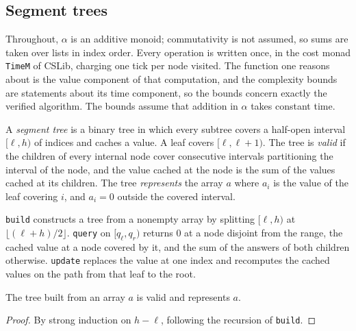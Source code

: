 %
\subsection{Segment trees}

Throughout, $\alpha$ is an additive monoid; commutativity is not assumed, so sums are taken
over lists in index order. Every operation is written once, in the cost monad
\texttt{TimeM} of CSLib, charging one tick per node visited. The function one reasons
about is the value component of that computation, and the complexity bounds are statements
about its time component, so the bounds concern exactly the verified algorithm. The bounds
assume that addition in $\alpha$ takes constant time.

\begin{definition}
  \label{def:segment-tree}
  \leanok
  A \emph{segment tree} is a binary tree in which every subtree covers a half-open
  interval $[\ell, h)$ of indices and caches a value. A leaf covers $[\ell, \ell + 1)$. The
  tree is \emph{valid} if the children of every internal node cover consecutive intervals
  partitioning the interval of the node, and the value cached at the node is the sum of the
  values cached at its children. The tree \emph{represents} the array $a$ where $a_i$ is the
  value of the leaf covering $i$, and $a_i = 0$ outside the covered interval.
\end{definition}

\begin{definition}
  \label{def:segment-tree-ops}
  \leanok
  \texttt{build} constructs a tree from a nonempty array by splitting $[\ell, h)$ at
  $\lfloor (\ell + h) / 2 \rfloor$. \texttt{query} on $[q_\ell, q_r)$ returns $0$ at a node
  disjoint from the range, the cached value at a node covered by it, and the sum of the
  answers of both children otherwise. \texttt{update} replaces the value at one index and
  recomputes the cached values on the path from that leaf to the root.
\end{definition}

\begin{theorem}
  \label{thm:segment-tree-build}
  \leanok
  The tree built from an array $a$ is valid and represents $a$.
\end{theorem}
\begin{proof}
  \leanok
  By strong induction on $h - \ell$, following the recursion of \texttt{build}.
\end{proof}

